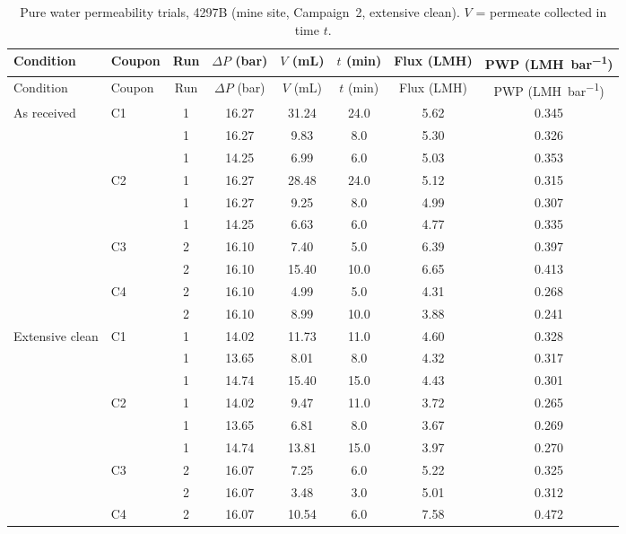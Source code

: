 {\footnotesize
\begin{longtable}{llcccccc}
  \caption{Pure water permeability trials, 4297B (mine site, Campaign~2, extensive clean). $V$ = permeate collected in time $t$.}
  \label{tab:app-pwp-4297B}\\
  \toprule
  Condition & Coupon & Run & $\Delta P$ (\unit{bar}) & $V$ (\unit{mL}) & $t$ (\unit{min}) & Flux (\unit{LMH}) & PWP (\unit{LMH.bar^{-1}}) \\
  \midrule
  \endfirsthead
  \toprule
  Condition & Coupon & Run & $\Delta P$ (\unit{bar}) & $V$ (\unit{mL}) & $t$ (\unit{min}) & Flux (\unit{LMH}) & PWP (\unit{LMH.bar^{-1}}) \\
  \midrule
  \endhead
  \bottomrule
  \endfoot
  As received & C1 & 1 & 16.27 & 31.24 & 24.0 & 5.62 & 0.345 \\
   &  & 1 & 16.27 & 9.83 & 8.0 & 5.30 & 0.326 \\
   &  & 1 & 14.25 & 6.99 & 6.0 & 5.03 & 0.353 \\
  \addlinespace[2pt]
   & C2 & 1 & 16.27 & 28.48 & 24.0 & 5.12 & 0.315 \\
   &  & 1 & 16.27 & 9.25 & 8.0 & 4.99 & 0.307 \\
   &  & 1 & 14.25 & 6.63 & 6.0 & 4.77 & 0.335 \\
  \addlinespace[2pt]
   & C3 & 2 & 16.10 & 7.40 & 5.0 & 6.39 & 0.397 \\
   &  & 2 & 16.10 & 15.40 & 10.0 & 6.65 & 0.413 \\
  \addlinespace[2pt]
   & C4 & 2 & 16.10 & 4.99 & 5.0 & 4.31 & 0.268 \\
   &  & 2 & 16.10 & 8.99 & 10.0 & 3.88 & 0.241 \\
  \midrule
  Extensive clean & C1 & 1 & 14.02 & 11.73 & 11.0 & 4.60 & 0.328 \\
   &  & 1 & 13.65 & 8.01 & 8.0 & 4.32 & 0.317 \\
   &  & 1 & 14.74 & 15.40 & 15.0 & 4.43 & 0.301 \\
  \addlinespace[2pt]
   & C2 & 1 & 14.02 & 9.47 & 11.0 & 3.72 & 0.265 \\
   &  & 1 & 13.65 & 6.81 & 8.0 & 3.67 & 0.269 \\
   &  & 1 & 14.74 & 13.81 & 15.0 & 3.97 & 0.270 \\
  \addlinespace[2pt]
   & C3 & 2 & 16.07 & 7.25 & 6.0 & 5.22 & 0.325 \\
   &  & 2 & 16.07 & 3.48 & 3.0 & 5.01 & 0.312 \\
  \addlinespace[2pt]
   & C4 & 2 & 16.07 & 10.54 & 6.0 & 7.58 & 0.472 \\

\end{longtable}}
